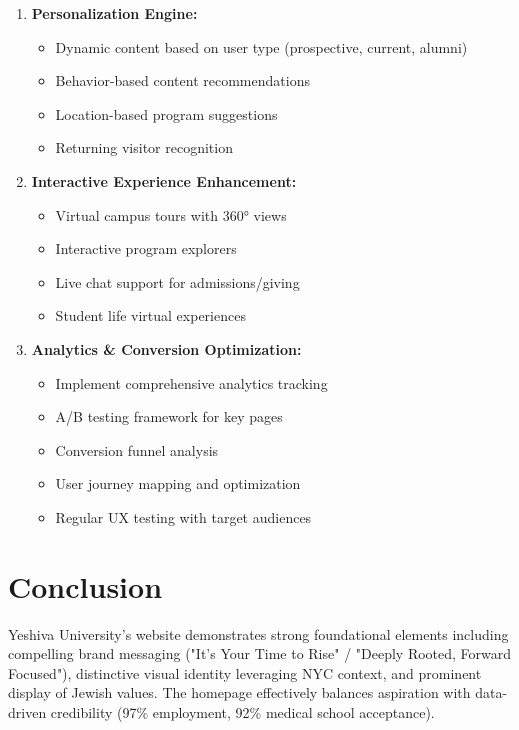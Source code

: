 \documentclass[12pt,letterpaper]{article}
\begin{document}
\begin{enumerate}[leftmargin=*]
    \item \textbf{Personalization Engine:}
    \begin{itemize}
        \item Dynamic content based on user type (prospective, current, alumni)
        \item Behavior-based content recommendations
        \item Location-based program suggestions
        \item Returning visitor recognition
    \end{itemize}

    \item \textbf{Interactive Experience Enhancement:}
    \begin{itemize}
        \item Virtual campus tours with 360° views
        \item Interactive program explorers
        \item Live chat support for admissions/giving
        \item Student life virtual experiences
    \end{itemize}

    \item \textbf{Analytics \& Conversion Optimization:}
    \begin{itemize}
        \item Implement comprehensive analytics tracking
        \item A/B testing framework for key pages
        \item Conversion funnel analysis
        \item User journey mapping and optimization
        \item Regular UX testing with target audiences
    \end{itemize}
\end{enumerate}

\section{Conclusion}

Yeshiva University's website demonstrates strong foundational elements including compelling brand messaging ("It's Your Time to Rise" / "Deeply Rooted, Forward Focused"), distinctive visual identity leveraging NYC context, and prominent display of Jewish values. The homepage effectively balances aspiration with data-driven credibility (97\% employment, 92\% medical school acceptance).
\end{document}
